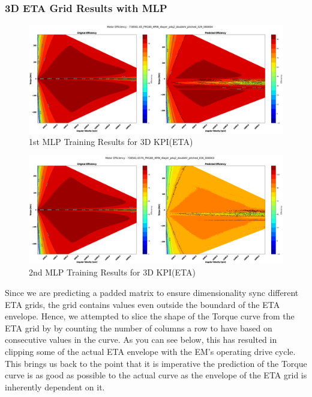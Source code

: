 \documentclass{report} %
\begin{document}
\subsubsection*{3D ETA Grid Results with \ac{MLP}}
\begin{figure}[H]
    \centering
    \includegraphics[width=1\textwidth]{./ReportImages/KPI3Dprediction3.png} 
    \caption{1st MLP Training Results for 3D KPI(ETA)} 
    \label{fig:1st MLP Training Results for 3D KPI(ETA)}
\end{figure}

\begin{figure}[H]
    \centering
    \includegraphics[width=1\textwidth]{./ReportImages/KPI3Dprediction4.png} 
    \caption{2nd MLP Training Results for 3D KPI(ETA)} 
    \label{fig:2nd MLP Training Results for 3D KPI(ETA)}
\end{figure}

Since we are predicting a padded matrix to ensure dimensionality sync different ETA grids, the grid contains values even outside the boundard of the ETA envelope.
Hence, we attempted to slice the shape of the Torque curve from the ETA grid by by counting the number of columns a row to have based on consecutive values in the curve.
As you can see below, this has resulted in clipping some of the actual ETA envelope with the \ac{EM}'s operating drive cycle.\\
This brings us back to the point that it is imperative the prediction of the Torque curve is as good as possible to the actual curve as the envelope of the ETA grid is inherently dependent on it.
\end{document}
